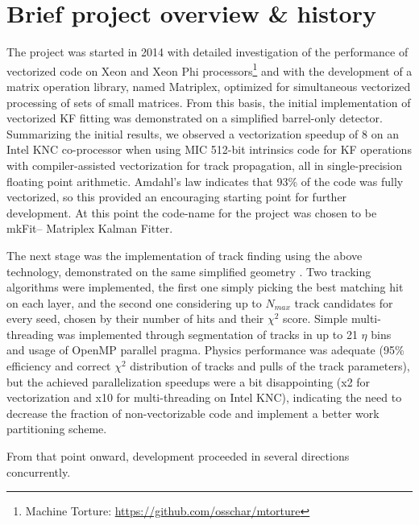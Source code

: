 \documentclass{webofc}
\def\mkfit{mkFit\xspace}
\begin{document}
\newpage

\section{Brief project overview \& history}
\label{sec:project-overview}

The project was started in 2014 with detailed investigation of the performance
of vectorized code on Xeon and Xeon Phi processors\footnote{Machine Torture:
  \url{https://github.com/osschar/mtorture}} and with the development of a
matrix operation library, named Matriplex, optimized for simultaneous vectorized
processing of sets of small matrices. From this basis, the initial
implementation of vectorized KF fitting was demonstrated on a simplified
barrel-only detector\cite{pkf-fit}. Summarizing the initial results, we observed
a vectorization speedup of 8 on an Intel KNC co-processor when using MIC 512-bit
intrinsics code for KF operations with compiler-assisted vectorization for track
propagation, all in single-precision floating point arithmetic.  Amdahl's law
indicates that 93\% of the code was fully vectorized, so this provided an
encouraging starting point for further development. At this point the code-name
for the project was chosen to be \mkfit -- Matriplex Kalman Fitter.

The next stage was the implementation of track finding using the above
technology, demonstrated on the same simplified geometry \cite{pkf-finding}. Two
tracking algorithms were implemented, the first one simply picking the best
matching hit on each layer, and the second one considering up to $N_{max}$ track
candidates for every seed, chosen by their number of hits and their $\chi^2$
score. Simple multi-threading was implemented through segmentation of tracks in
up to 21 $\eta$ bins and usage of OpenMP parallel pragma. Physics performance
was adequate (95\% efficiency and correct $\chi^2$ distribution of tracks and
pulls of the track parameters), but the achieved parallelization speedups were a
bit disappointing (x2 for vectorization and x10 for multi-threading on Intel
KNC), indicating the need to decrease the fraction of non-vectorizable code and
implement a better work partitioning scheme.

From that point onward, development proceeded in several directions concurrently.
\end{document}
